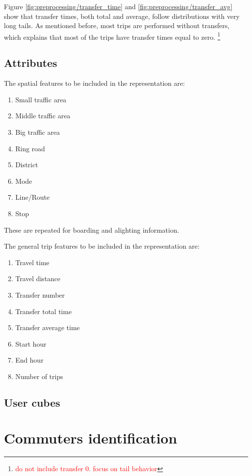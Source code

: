 \documentclass{article}
\newcommand{\selfnote}[1]{\footnote{\textcolor{red}{#1}}}
\begin{document}
Figure \ref{fig:preprocessing/transfer_time} and \ref{fig:preprocessing/transfer_avg} show that transfer times, both total and average, follow distributions with very long tails. As mentioned before, most trips are performed without transfers, which explains that most of the trips have transfer times equal to zero. \selfnote{do not include transfer 0. focus on tail behavior}


\subsection{Attributes}
The spatial features to be included in the representation are:

\begin{enumerate}
\item Small traffic area
\item Middle traffic area
\item Big traffic area
\item Ring road
\item District
\item Mode
\item Line/Route
\item Stop
\end{enumerate}

These are repeated for boarding and alighting information.

The general trip features to be included in the representation are: 

\begin{enumerate}
\item Travel time
\item Travel distance
\item Transfer number
\item Transfer total time
\item Transfer average time
\item Start hour
\item End hour
\item Number of trips
\end{enumerate}

\subsection{User cubes}


\newpage
\section{Commuters identification}
\label{sec:partII}
\end{document}
